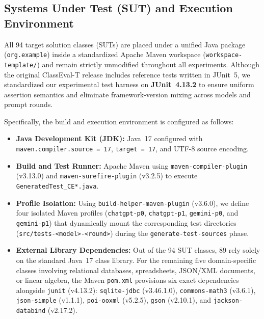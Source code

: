 \subsection{Systems Under Test (SUT) and Execution Environment}
\label{subsec:environment}
All 94 target solution classes (SUTs) are placed under a unified Java package (\texttt{org.\allowbreak example}) inside a standardized Apache Maven workspace (\texttt{workspace-\allowbreak template/}) and remain strictly unmodified throughout all experiments. Although the original ClassEval-T release includes reference tests written in JUnit~5, we standardized our experimental test harness on \textbf{JUnit~4.13.2} to ensure uniform assertion semantics and eliminate framework-version mixing across models and prompt rounds.

Specifically, the build and execution environment is configured as follows:
\begin{itemize}
    \item \textbf{Java Development Kit (JDK):} Java~17 configured with \texttt{maven.\allowbreak compiler.\allowbreak source = 17}, \texttt{target = 17}, and UTF-8 source encoding.
    \item \textbf{Build and Test Runner:} Apache Maven using \texttt{maven-\allowbreak compiler-\allowbreak plugin} (v3.13.0) and \texttt{maven-\allowbreak surefire-\allowbreak plugin} (v3.2.5) to execute \texttt{GeneratedTest\_\allowbreak CE*.java}.
    \item \textbf{Profile Isolation:} Using \texttt{build-\allowbreak helper-\allowbreak maven-\allowbreak plugin} (v3.6.0), we define four isolated Maven profiles (\texttt{chatgpt-p0}, \texttt{chatgpt-p1}, \texttt{gemini-p0}, and \texttt{gemini-p1}) that dynamically mount the corresponding test directories (\texttt{src/\allowbreak tests-\allowbreak <model>-\allowbreak <round>}) during the \texttt{generate-\allowbreak test-\allowbreak sources} phase.
    \item \textbf{External Library Dependencies:} Out of the 94 SUT classes, 89 rely solely on the standard Java~17 class library. For the remaining five domain-specific classes involving relational databases, spreadsheets, JSON/XML documents, or linear algebra, the Maven \texttt{pom.xml} provisions six exact dependencies alongside \texttt{junit} (v4.13.2): \texttt{sqlite-\allowbreak jdbc} (v3.46.1.0), \texttt{commons-\allowbreak math3} (v3.6.1), \texttt{json-\allowbreak simple} (v1.1.1), \texttt{poi-\allowbreak ooxml} (v5.2.5), \texttt{gson} (v2.10.1), and \texttt{jackson-\allowbreak databind} (v2.17.2).
\end{itemize}

